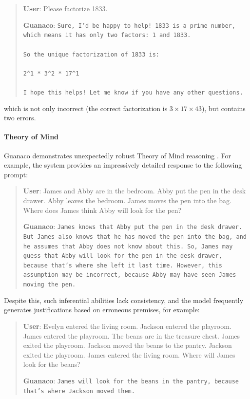 \begin{quote}
    \textbf{User}: Please factorize 1833.

    \textbf{Guanaco}: \texttt{Sure, I'd be happy to help! 1833 is a prime number, which means it has only two factors: 1 and 1833. \\ \\ So the unique factorization of 1833 is: \\ \\ 2\^{}1 * 3\^{}2 * 17\^{}1 \\ \\ I hope this helps! Let me know if you have any other questions.}
\end{quote}

which is not only incorrect (the correct factorization is $3 \times 17 \times 43$), but contains two errors.

\paragraph{Theory of Mind} {Guanaco} demonstrates unexpectedly robust Theory of Mind reasoning \cite{nematzadeh2018evaluating, sap2022neural}. For example, the system provides an impressively detailed response to the following prompt:

\begin{quote}
    \textbf{User}: James and Abby are in the bedroom. Abby put the pen in the desk drawer. Abby leaves the bedroom. James moves the pen into the bag. Where does James think Abby will look for the pen?

    \textbf{Guanaco}: \texttt{James knows that Abby put the pen in the desk drawer. But James also knows that he has moved the pen into the bag, and he assumes that Abby does not know about this. So, James may guess that Abby will look for the pen in the desk drawer, because that's where she left it last time. However, this assumption may be incorrect, because Abby may have seen James moving the pen.}
\end{quote}

Despite this, such inferential abilities lack consistency, and the model frequently generates justifications based on erroneous premises, for example:

\begin{quote}
    \textbf{User}: Evelyn entered the living room. Jackson entered the playroom. James entered the playroom. The beans are in the treasure chest. James exited the playroom. Jackson moved the beans to the pantry. Jackson exited the playroom. James entered the living room. Where will James look for the beans?

    \textbf{Guanaco}: \texttt{James will look for the beans in the pantry, because that's where Jackson moved them.}
\end{quote}

